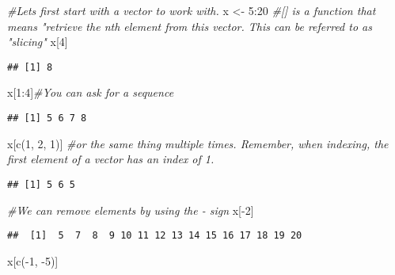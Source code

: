 \documentclass[
]{article}
\newenvironment{Shaded}{\begin{snugshade}}{\end{snugshade}}
\newcommand{\CommentTok}[1]{\textcolor[rgb]{0.56,0.35,0.01}{\textit{#1}}}
\newcommand{\DecValTok}[1]{\textcolor[rgb]{0.00,0.00,0.81}{#1}}
\newcommand{\FunctionTok}[1]{\textcolor[rgb]{0.00,0.00,0.00}{#1}}
\newcommand{\NormalTok}[1]{#1}
\newcommand{\OtherTok}[1]{\textcolor[rgb]{0.56,0.35,0.01}{#1}}
\newcommand{\SpecialCharTok}[1]{\textcolor[rgb]{0.00,0.00,0.00}{#1}}
\begin{document}
\begin{Shaded}
\begin{Highlighting}[]
\CommentTok{\#Let\textquotesingle{}s first start with a vector to work with.}
\NormalTok{x }\OtherTok{\textless{}{-}} \DecValTok{5}\SpecialCharTok{:}\DecValTok{20}
\CommentTok{\#[] is a function that means "retrieve the nth element from this vector. This can be referred to as "slicing"}
\NormalTok{x[}\DecValTok{4}\NormalTok{]}
\end{Highlighting}
\end{Shaded}

\begin{verbatim}
## [1] 8
\end{verbatim}

\begin{Shaded}
\begin{Highlighting}[]
\NormalTok{x[}\DecValTok{1}\SpecialCharTok{:}\DecValTok{4}\NormalTok{]}\CommentTok{\#You can ask for a sequence}
\end{Highlighting}
\end{Shaded}

\begin{verbatim}
## [1] 5 6 7 8
\end{verbatim}

\begin{Shaded}
\begin{Highlighting}[]
\NormalTok{x[}\FunctionTok{c}\NormalTok{(}\DecValTok{1}\NormalTok{, }\DecValTok{2}\NormalTok{, }\DecValTok{1}\NormalTok{)] }\CommentTok{\#or the same thing multiple times. Remember, when indexing, the first element of a vector has an index of 1.}
\end{Highlighting}
\end{Shaded}

\begin{verbatim}
## [1] 5 6 5
\end{verbatim}

\begin{Shaded}
\begin{Highlighting}[]
\CommentTok{\#We can remove elements by using the {-} sign}
\NormalTok{x[}\SpecialCharTok{{-}}\DecValTok{2}\NormalTok{]}
\end{Highlighting}
\end{Shaded}

\begin{verbatim}
##  [1]  5  7  8  9 10 11 12 13 14 15 16 17 18 19 20
\end{verbatim}

\begin{Shaded}
\begin{Highlighting}[]
\NormalTok{x[}\FunctionTok{c}\NormalTok{(}\SpecialCharTok{{-}}\DecValTok{1}\NormalTok{, }\SpecialCharTok{{-}}\DecValTok{5}\NormalTok{)]}
\end{Highlighting}
\end{Shaded}
\end{document}

